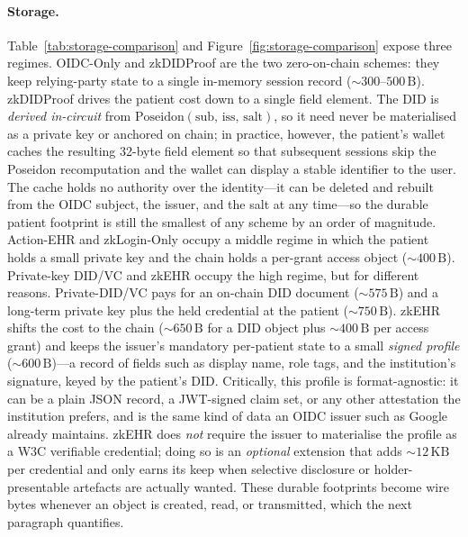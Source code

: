 \paragraph{Storage.}
Table~\ref{tab:storage-comparison} and
Figure~\ref{fig:storage-comparison} expose three regimes.
\textsf{OIDC-Only} and \textsf{zkDIDProof} are the two zero-on-chain
schemes: they keep relying-party state to a single in-memory session
record ($\sim\!300$--$500\,\mathrm{B}$). \textsf{zkDIDProof} drives the
patient cost down to a single field element. The DID is \emph{derived
in-circuit} from
$\mathrm{Poseidon}(\mathrm{sub},\,\mathrm{iss},\,\mathrm{salt})$, so it
need never be materialised as a private key or anchored on chain; in
practice, however, the patient's wallet caches the resulting 32-byte
field element so that subsequent sessions skip the Poseidon recomputation
and the wallet can display a stable identifier to the user. The cache
holds no authority over the identity---it can be deleted and rebuilt
from the OIDC subject, the issuer, and the salt at any time---so the
durable patient footprint is still the smallest of any scheme by an
order of magnitude.
\textsf{Action-EHR} and \textsf{zkLogin-Only} occupy a middle regime in
which the patient holds a small private key and the chain holds a
per-grant access object ($\sim\!400\,\mathrm{B}$).
\textsf{Private-key DID/VC} and \textsf{zkEHR} occupy the high regime,
but for different reasons. \textsf{Private-DID/VC} pays for an on-chain
DID document ($\sim\!575\,\mathrm{B}$) and a long-term private key plus
the held credential at the patient ($\sim\!750\,\mathrm{B}$).
\textsf{zkEHR} shifts the cost to the chain ($\sim\!650\,\mathrm{B}$ for
a DID object plus $\sim\!400\,\mathrm{B}$ per access grant) and keeps
the issuer's mandatory per-patient state to a small \emph{signed
profile} ($\sim\!600\,\mathrm{B}$)---a record of fields such as display
name, role tags, and the institution's signature, keyed by the patient's
DID. Critically, this profile is format-agnostic: it can be a plain
JSON record, a JWT-signed claim set, or any other attestation the
institution prefers, and is the same kind of data an OIDC issuer such as
Google already maintains. \textsf{zkEHR} does \emph{not} require the
issuer to materialise the profile as a W3C verifiable credential; doing
so is an \emph{optional} extension that adds $\sim\!12\,\mathrm{KB}$ per
credential and only earns its keep when selective disclosure or
holder-presentable artefacts are actually wanted. These durable
footprints become wire bytes whenever an object is created, read, or
transmitted, which the next paragraph quantifies.

